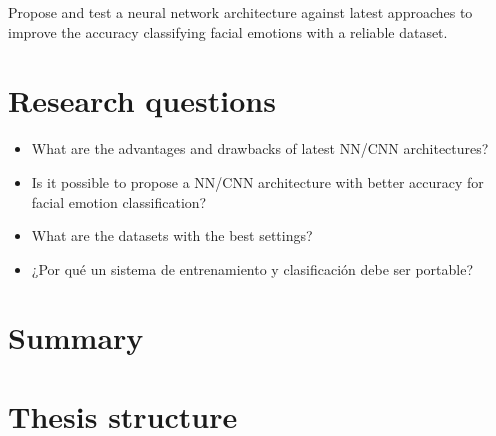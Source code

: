 Propose and test a neural network architecture against latest approaches to improve the accuracy classifying facial emotions with a reliable dataset.


\section{Research questions}

\begin{itemize}
  \item What are the advantages and drawbacks of latest NN/CNN architectures?
  \item Is it possible to propose a NN/CNN architecture with better accuracy for facial emotion classification?
  \item What are the datasets with the best settings?
  \item ¿Por qué un sistema de entrenamiento y clasificación debe ser portable?
\end{itemize}


\section{Summary}

\section{Thesis structure}
